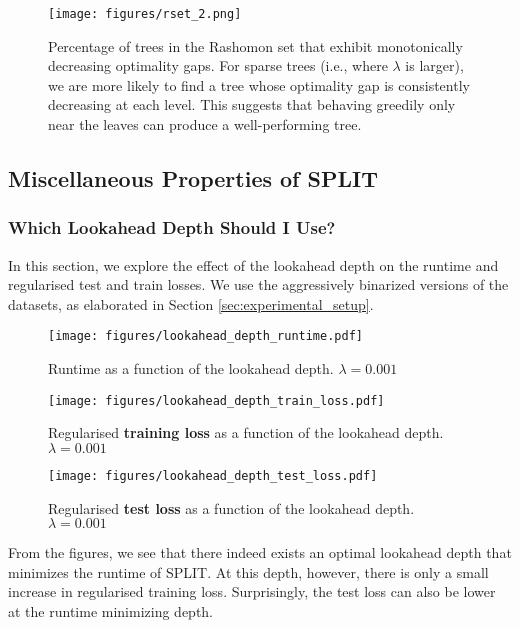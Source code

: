 \begin{figure}[H]
    \centering
    \texttt{[image: figures/rset\_2.png]}
    \caption{Percentage of trees in the Rashomon set that exhibit monotonically decreasing optimality gaps. For sparse trees (i.e., where $\lambda$ is larger), we are more likely to find a tree whose optimality gap is consistently decreasing at each level. This suggests that behaving greedily only near the leaves can produce a well-performing tree.}
    \label{fig:rset_monotonically_decreasing_optimality_gap}
\end{figure}

\subsection{Miscellaneous Properties of SPLIT}
\label{sec:appendix_evaluation}
\subsubsection{Which Lookahead Depth Should I Use?}
In this section, we explore the effect of the lookahead depth on the runtime and regularised test and train losses. We use the aggressively binarized versions of the datasets, as elaborated in Section \ref{sec:experimental_setup}. 
\begin{figure}[H]
    \centering
    \texttt{[image: figures/lookahead\_depth\_runtime.pdf]}
    \caption{Runtime as a function of the lookahead depth. $\lambda = 0.001$}
    \label{fig:lookahead_depth_runtime}
\end{figure}
\begin{figure}[H]
    \centering
    \texttt{[image: figures/lookahead\_depth\_train\_loss.pdf]}
    \caption{Regularised \textbf{training loss} as a function of the lookahead depth. $\lambda = 0.001$}
    \label{fig:lookahead_depth_train_loss}
\end{figure}
\begin{figure}[H]
    \centering
    \texttt{[image: figures/lookahead\_depth\_test\_loss.pdf]}
    \caption{Regularised \textbf{test loss} as a function of the lookahead depth. $\lambda = 0.001$}
    \label{fig:lookahead_depth_test_loss}
\end{figure}
From the figures, we see that there indeed exists an optimal lookahead depth that minimizes the runtime of SPLIT. At this depth, however, there is only a small increase in regularised training loss. Surprisingly, the test loss can also be lower at the runtime minimizing depth. 

